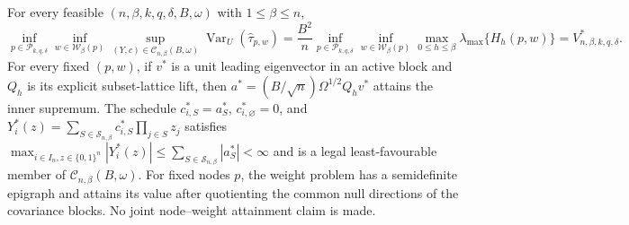 For every feasible \((n,\beta,k,q,\delta,B,\omega)\) with \(1\le\beta\le n\),
\[
\inf_{p\in\mathcal P_{k,q,\delta}}\inf_{w\in\mathcal W_\beta(p)}\sup_{(Y,c)\in\mathcal C_{n,\beta}(B,\omega)}\operatorname{Var}_U(\widehat\tau_{p,w})=\frac{B^2}{n}\inf_{p\in\mathcal P_{k,q,\delta}}\inf_{w\in\mathcal W_\beta(p)}\max_{0\le h\le\beta}\lambda_{\max}\{H_h(p,w)\}=V^*_{n,\beta,k,q,\delta}.
\]
For every fixed \((p,w)\), if \(v^*\) is a unit leading eigenvector in an active block and \(Q_h\) is its explicit subset-lattice lift, then \(a^*=(B/\sqrt n)\Omega^{1/2}Q_hv^*\) attains the inner supremum. The schedule \(c^*_{i,S}=a^*_S\), \(c^*_{i,\varnothing}=0\), and \(Y_i^*(z)=\sum_{S\in\mathcal S_{n,\beta}}c^*_{i,S}\prod_{j\in S}z_j\) satisfies \(\max_{i\in I_n,z\in\{0,1\}^n}|Y_i^*(z)|\le\sum_{S\in\mathcal S_{n,\beta}}|a_S^*|<\infty\) and is a legal least-favourable member of \(\mathcal C_{n,\beta}(B,\omega)\). For fixed nodes \(p\), the weight problem has a semidefinite epigraph and attains its value after quotienting the common null directions of the covariance blocks. No joint node--weight attainment claim is made.